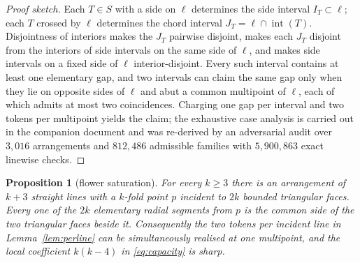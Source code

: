 \documentclass[11pt]{article}
\newtheorem{proposition}[theorem]{Proposition}
\theoremstyle{definition}
\newcommand{\intr}{\operatorname{int}}
\begin{document}
\begin{proof}[Proof sketch]
Each $T\in S$ with a side on $\ell$ determines the side interval
$I_T\subset\ell$; each $T$ crossed by $\ell$ determines the chord interval
$J_T=\ell\cap\intr(T)$. Disjointness of interiors makes the $J_T$ pairwise
disjoint, makes each $J_T$ disjoint from the interiors of side intervals on
the same side of $\ell$, and makes side intervals on a fixed side of $\ell$
interior-disjoint. Every such interval contains at least one elementary gap,
and two intervals can claim the same gap only when they lie on opposite sides
of $\ell$ and abut a common multipoint of $\ell$, each of which admits at
most two coincidences. Charging one gap per interval and two tokens per
multipoint yields the claim; the exhaustive case analysis is carried out in
the companion document \cite[\S3]{companion} and was re-derived by an
adversarial audit over $3{,}016$ arrangements and $812{,}486$ admissible
families with $5{,}900{,}863$ exact linewise checks.
\end{proof}

\begin{proposition}[flower saturation]\label{prop:flower}
For every $k\ge3$ there is an arrangement of $k+3$ straight lines with a
$k$-fold point $p$ incident to $2k$ bounded triangular faces. Every one of
the $2k$ elementary radial segments from $p$ is the common side of the two
triangular faces beside it. Consequently the two tokens per incident line in
Lemma~\ref{lem:perline} can be simultaneously realised at one multipoint, and
the local coefficient $k(k-4)$ in \eqref{eq:capacity} is sharp.
\end{proposition}
\end{document}
